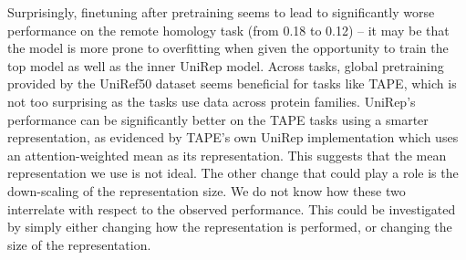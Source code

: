 Surprisingly, finetuning after pretraining seems to lead to significantly worse performance on the remote homology task (from 0.18 to 0.12) -- it may be that the model is more prone to overfitting when given the opportunity to train the top model as well as the inner UniRep model. Across tasks, global pretraining provided by the UniRef50 dataset seems beneficial for tasks like TAPE, which is not too surprising as the tasks use data across protein families. UniRep's performance can be significantly better on the TAPE tasks using a smarter representation, as evidenced by TAPE's own UniRep implementation which uses an attention-weighted mean as its representation. This suggests that the mean representation we use is not ideal. The other change that could play a role is the down-scaling of the representation size. We do not know how these two interrelate with respect to the observed performance. This could be investigated by simply either changing how the representation is performed, or changing the size of the representation.

